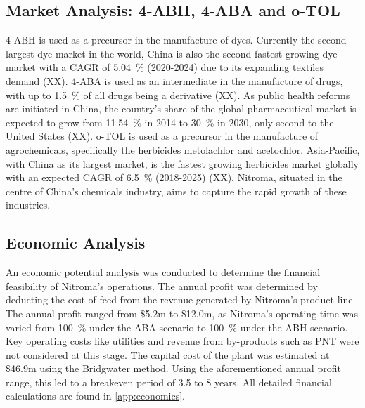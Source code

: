 \subsection{Market Analysis: 4-ABH, 4-ABA and o-TOL}
4-ABH is used as a precursor in the manufacture of dyes. Currently the second largest dye market in the world, China is also the second fastest-growing dye market with a CAGR of \SI{5.04}{\percent} (2020-2024) due to its expanding textiles demand (XX). 4-ABA is used as an intermediate in the manufacture of drugs, with up to \SI{1.5}{\percent} of all drugs being a derivative (XX). As public health reforms are initiated in China, the country’s share of the global pharmaceutical market is expected to grow from \SI{11.54}{\percent} in 2014 to \SI{30}{\percent} in 2030, only second to the United States (XX). o-TOL is used as a precursor in the manufacture of agrochemicals, specifically the herbicides metolachlor and acetochlor. Asia-Pacific, with China as its largest market, is the fastest growing herbicides market globally with an expected CAGR of \SI{6.5}{\percent} (2018-2025) (XX). Nitroma, situated in the centre of China’s chemicals industry, aims to capture the rapid growth of these industries.  

\subsection{Economic Analysis}
An economic potential analysis was conducted to determine the financial feasibility of Nitroma’s operations. The annual profit was determined by deducting the cost of feed from the revenue generated by Nitroma's product line. The annual profit ranged from \$5.2m to \$12.0m, as Nitroma's operating time was varied from \SI{100}{\percent} under the ABA scenario to \SI{100}{\percent} under the ABH scenario. Key operating costs like utilities and revenue from by-products such as PNT were not considered at this stage. The capital cost of the plant was estimated at \$46.9m using the Bridgwater method. Using the aforementioned annual profit range, this led to a breakeven period of 3.5 to 8 years. All detailed financial calculations are found in \cref{app:economics}.